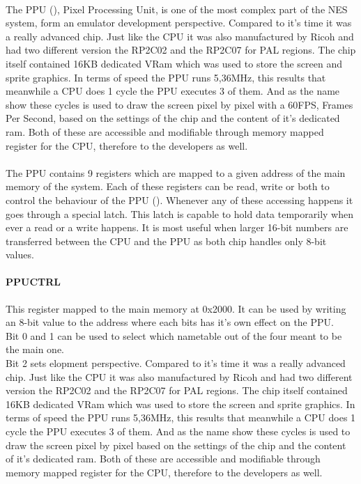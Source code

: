 \documentclass[]{report}
\begin{document}
\paragraph{ }
The PPU (\cite{NDPP}), Pixel Processing Unit, is one of the most complex part of the NES system, form an emulator development perspective. Compared to it's time it was a really advanced chip. Just like the CPU it was also manufactured by Ricoh and had two different version the RP2C02 and the RP2C07 for PAL regions. The chip itself contained 16KB dedicated VRam which was used to store the screen and sprite graphics. In terms of speed the PPU runs 5,36MHz, this results that meanwhile a CPU does 1 cycle the PPU executes 3 of them. And as the name show these cycles is used to draw the screen pixel by pixel with a 60FPS, Frames Per Second, based on the settings of the chip and the content of it's dedicated ram. Both of these are accessible and modifiable through memory mapped register for the CPU, therefore to the developers as well.

\paragraph{ }
The PPU contains 9 registers which are mapped to a given address of the main memory of the system. Each of these registers can be read, write or  both to control the behaviour of the PPU (\cite{PPRG}). Whenever any of these accessing happens it goes through a special latch. This latch is capable to hold data temporarily when ever a read or a write happens. It is most useful when larger 16-bit numbers are transferred between the CPU and the PPU as both chip handles only 8-bit values.

\paragraph{PPUCTRL}
This register mapped to the main memory at 0x2000. It can be used by writing an 8-bit value to the address where  each bits has it's own effect on the PPU.
\\
Bit 0 and 1 can be used to select which nametable out of the four meant to be the main one.
\\
Bit 2 sets elopment perspective. Compared to it's time it was a really advanced chip. Just like the CPU it was also manufactured by Ricoh and had two different version the RP2C02 and the RP2C07 for PAL regions. The chip itself contained 16KB dedicated VRam which was used to store the screen and sprite graphics. In terms of speed the PPU runs 5,36MHz, this results that meanwhile a CPU does 1 cycle the PPU executes 3 of them. And as the name show these cycles is used to draw the screen pixel by pixel based on the settings of the chip and the content of it's dedicated ram. Both of these are accessible and modifiable through memory mapped register for the CPU, therefore to the developers as well.
\end{document}

